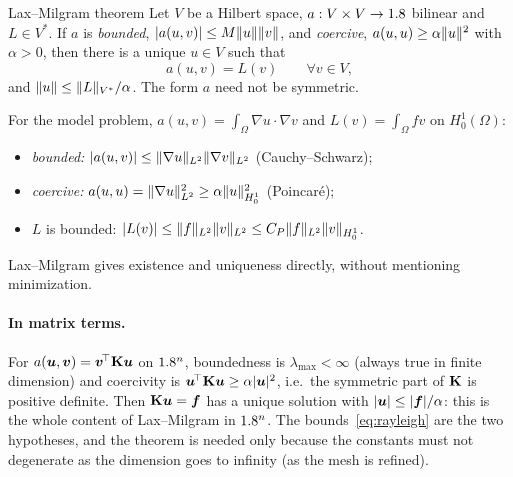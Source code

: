 \begin{gbox}{Lax--Milgram theorem}
Let $V$ be a Hilbert space, $a:V\times V\to1.8$ bilinear and $L\in V^\ast$.
If $a$ is \emph{bounded}, $|a(u,v)|\le M\lVert u\rVert\lVert v\rVert$, and \emph{coercive},
$a(u,u)\ge\alpha\lVert u\rVert^2$ with $\alpha>0$, then there is a unique $u\in V$
such that
\[
  a(u,v)=L(v)\qquad\forall v\in V,
\]
and $\lVert u\rVert\le\lVert L\rVert_{V^\ast}/\alpha$. The form $a$ need not be symmetric.
\end{gbox}

For the model problem, $\displaystyle a(u,v)=\int_\Omega\nabla u\cdot\nabla v$ and
$\displaystyle L(v)=\int_\Omega fv$ on $H^1_0(\Omega)$:
\begin{itemize}
  \item \emph{bounded:} $|a(u,v)|\le\lVert \nabla u\rVert_{L^2}\lVert \nabla v\rVert_{L^2}$
  (Cauchy--Schwarz);
  \item \emph{coercive:} $a(u,u)=\lVert \nabla u\rVert_{L^2}^2\ge\alpha\lVert u\rVert_{H^1_0}^2$
  (Poincar\'e);
  \item $L$ is bounded: $|L(v)|\le\lVert f\rVert_{L^2}\lVert v\rVert_{L^2}\le C_P\lVert f\rVert_{L^2}\lVert v\rVert_{H^1_0}$.
\end{itemize}
Lax--Milgram gives existence and uniqueness directly, without mentioning
minimization.

\paragraph{In matrix terms.} For $a(\bm{u},\bm{v})=\bm{v}^{\!\top}\mathbf{K}\bm{u}$ on $1.8^n$,
boundedness is $\lambda_{\max}<\infty$ (always true in finite dimension) and
coercivity is $\bm{u}^{\!\top}\mathbf{K}\bm{u}\ge\alpha|\bm{u}|^2$, i.e.\ the symmetric part of
$\mathbf{K}$ is positive definite. Then $\mathbf{K}\bm{u}=\bm{f}$ has a unique solution
with $|\bm{u}|\le|\bm{f}|/\alpha$: this is the whole content of Lax--Milgram in
$1.8^n$. The bounds~\eqref{eq:rayleigh} are the two hypotheses, and the theorem
is needed only because the constants must not degenerate as the dimension
goes to infinity (as the mesh is refined).

